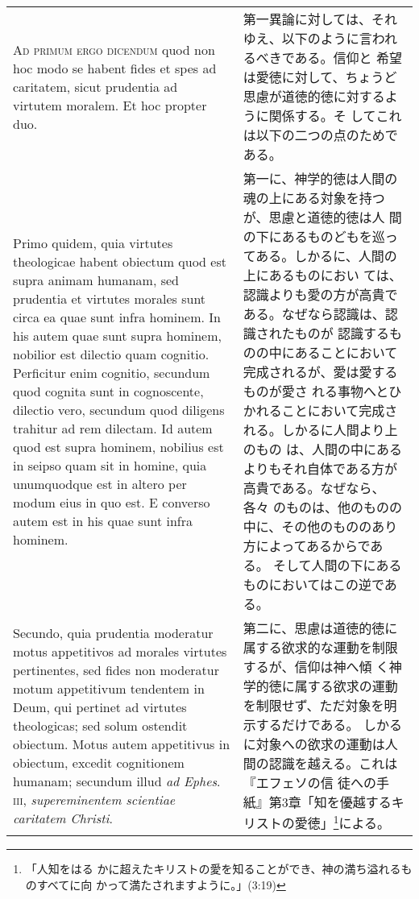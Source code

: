 \documentclass[10pt]{jsarticle}
\begin{document}
\begin{longtable}{p{21em}p{21em}}
 \\



 {\scshape Ad primum ergo dicendum} quod non hoc modo se habent fides
 et spes ad caritatem, sicut prudentia ad virtutem moralem. Et hoc
 propter duo.


 &

 第一異論に対しては、それゆえ、以下のように言われるべきである。信仰と
 希望は愛徳に対して、ちょうど思慮が道徳的徳に対するように関係する。そ
 してこれは以下の二つの点のためである。
 

 \\


 Primo quidem, quia virtutes theologicae habent obiectum
 quod est supra animam humanam, sed prudentia et virtutes morales sunt
 circa ea quae sunt infra hominem. In his autem quae sunt supra
 hominem, nobilior est dilectio quam cognitio. Perficitur enim
 cognitio, secundum quod cognita sunt in cognoscente, dilectio vero,
 secundum quod diligens trahitur ad rem dilectam. Id autem quod est
 supra hominem, nobilius est in seipso quam sit in homine, quia
 unumquodque est in altero per modum eius in quo est. E converso autem
 est in his quae sunt infra hominem.


 &

 第一に、神学的徳は人間の魂の上にある対象を持つが、思慮と道徳的徳は人
 間の下にあるものどもを巡ってある。しかるに、人間の上にあるものにおい
 ては、認識よりも愛の方が高貴である。なぜなら認識は、認識されたものが
 認識するものの中にあることにおいて完成されるが、愛は愛するものが愛さ
 れる事物へとひかれることにおいて完成される。しかるに人間より上のもの
 は、人間の中にあるよりもそれ自体である方が高貴である。なぜなら、各々
 のものは、他のものの中に、その他のもののあり方によってあるからである。
 そして人間の下にあるものにおいてはこの逆である。

 \\


 Secundo, quia prudentia moderatur motus appetitivos ad morales
 virtutes pertinentes, sed fides non moderatur motum appetitivum
 tendentem in Deum, qui pertinet ad virtutes theologicas; sed solum
 ostendit obiectum. Motus autem appetitivus in obiectum, excedit
 cognitionem humanam; secundum illud {\itshape ad Ephes}.~{\scshape
 iii}, {\itshape supereminentem scientiae caritatem Christi}.

 &

 第二に、思慮は道徳的徳に属する欲求的な運動を制限するが、信仰は神へ傾
 く神学的徳に属する欲求の運動を制限せず、ただ対象を明示するだけである。
 しかるに対象への欲求の運動は人間の認識を越える。これは『エフェソの信
 徒への手紙』第3章「知を優越するキリストの愛徳」\footnote{「人知をはる
 かに超えたキリストの愛を知ることができ、神の満ち溢れるものすべてに向
 かって満たされますように。」(3:19)}による。


\end{longtable}
\end{document}
